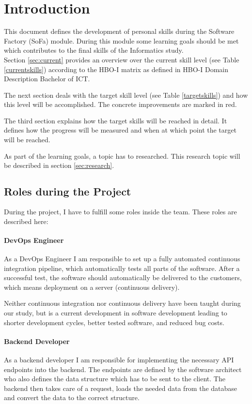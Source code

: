 \section{Introduction}
\label{sec:intro}

This document defines the development of personal skills during the Software Factory (SoFa) module.
During this module some learning goals should be met which contributes to the final skills of the Informatics study.
~\\
Section \ref{sec:current} provides an overview over the current skill level (see Table \ref{currentskills}) according to the HBO-I matrix as defined in \glqq HBO-I Domain Description Bachelor of ICT\grqq.

The next section deals with the target skill level (see Table \ref{targetskills}) and how this level will be accomplished. The concrete improvements are marked in red.

The third section explains how the target skills will be reached in detail. It defines how the progress will be measured and when at which point the target will be reached.

As part of the learning goals, a topic has to researched. This research topic will be described in section \ref{sec:research}.

\subsection{Roles during the Project}

During the project, I have to fulfill some roles inside the team. These roles are described here:

\paragraph{DevOps Engineer} As a DevOps Engineer I am responsible to set up a fully automated continuous integration pipeline, which automatically tests all parts of the software. After a successful test, the software should  automatically be delivered to the customers, which means deployment on a server (continuous delivery). 

Neither continuous integration nor continuous delivery have been taught during our study, but is a current development in software development leading to shorter development cycles, better tested software, and reduced bug costs.


\paragraph{Backend Developer} As a backend developer I am responsible for implementing the necessary API endpoints into the backend. The endpoints are defined by the software architect who also defines the data structure which has to be sent to the client. The backend then takes care of a request, loads the needed data from the database and convert the data to the correct structure.

